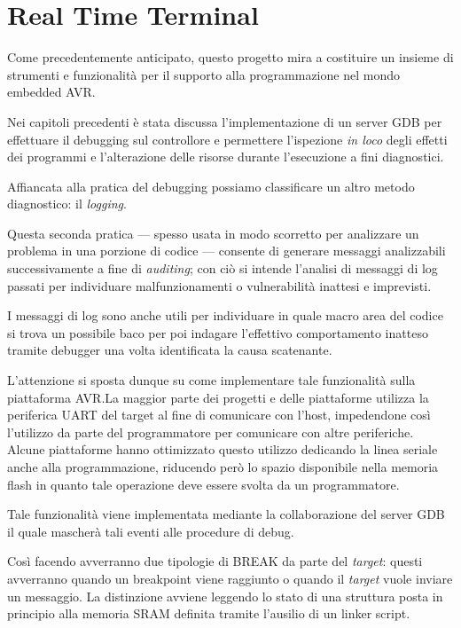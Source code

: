 \section{Real Time Terminal}\label{s:rtt}

Come precedentemente anticipato, questo progetto mira a costituire un insieme di strumenti e funzionalità per il supporto alla programmazione nel mondo embedded AVR.\@

Nei capitoli precedenti è stata discussa l'implementazione di un server GDB per effettuare il debugging sul controllore e permettere l'ispezione \textit{in loco} degli effetti dei programmi e l'alterazione delle risorse durante l'esecuzione a fini diagnostici. 

Affiancata alla pratica del debugging possiamo classificare un altro metodo diagnostico: il \textit{logging}.

Questa seconda pratica --- spesso usata in modo scorretto per analizzare un problema in una porzione di codice --- consente di generare messaggi analizzabili successivamente a fine di \textit{auditing}; con ciò si intende l'analisi di messaggi di log passati per individuare malfunzionamenti o vulnerabilità inattesi e imprevisti.

I messaggi di log sono anche utili per individuare in quale macro area del codice si trova un possibile baco per poi indagare l'effettivo comportamento inatteso tramite debugger una volta identificata la causa scatenante.

L'attenzione si sposta dunque su come implementare tale funzionalità sulla piattaforma AVR.\@ La maggior parte dei progetti e delle piattaforme utilizza la periferica UART del target al fine di comunicare con l'host, impedendone così l'utilizzo da parte del programmatore per comunicare con altre periferiche. Alcune piattaforme hanno ottimizzato questo utilizzo dedicando la linea seriale anche alla programmazione, riducendo però lo spazio disponibile nella memoria flash in quanto tale operazione deve essere svolta da un programmatore. 

Tale funzionalità viene implementata %
mediante la collaborazione del server GDB il quale mascherà tali eventi alle procedure di debug.

Così facendo avverranno due tipologie di BREAK da parte del \textit{target}: questi avverranno quando un breakpoint viene raggiunto o quando il \textit{target} vuole inviare un messaggio. La distinzione avviene leggendo lo stato di una struttura posta in principio alla memoria SRAM definita tramite l'ausilio di un linker script.

